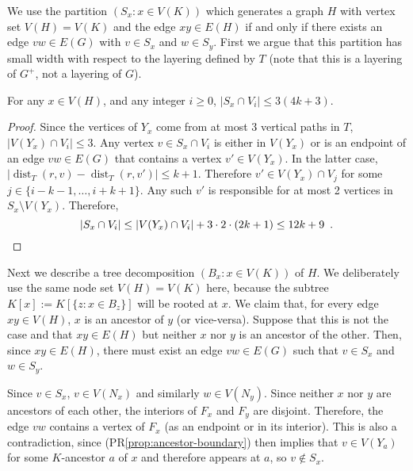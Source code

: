 \documentclass{patmorin}
\DeclareMathOperator{\dist}{dist}
\renewcommand{\propref}[1]{(PR\ref{prop:#1})}
\begin{document}

We use the partition $(S_x: x\in V(K))$ which generates a graph $H$ with vertex set $V(H)=V(K)$ and the edge $xy\in E(H)$ if and only if there exists an edge $vw\in E(G)$ with $v\in S_x$ and $w\in S_y$.  First we argue that this partition has small width with respect to the layering defined by $T$ (note that this is a layering of $G^+$, not a layering of $G$).

\begin{clm}
  For any $x\in V(H)$, and any integer $i\ge 0$, $|S_x\cap V_i|\le 3(4k+3)$.
\end{clm}

\begin{proof}
  Since the vertices of $Y_x$ come from at most 3 vertical paths in $T$, $|V(Y_x)\cap V_i|\le 3$.  Any vertex $v\in S_x\cap V_i$ is either in $V(Y_x)$ or is an endpoint of an edge $vw\in E(G)$ that contains a vertex $v'\in V(Y_x)$.  In the latter case, $|\dist_T(r,v)-\dist_T(r, v')|\le k+1$.  Therefore $v'\in V(Y_x)\cap V_{j}$ for some $j\in\{i-k-1,\ldots,i+k+1\}$.   Any such $v'$ is responsible for at most 2 vertices in $S_x\setminus V(Y_x)$. Therefore,
  \[  |S_x\cap V_i| \le |V(Y_x)\cap V_i| + 3\cdot 2\cdot (2k+1) \le 12k+9 \enspace . \qedhere \]
\end{proof}

Next we describe a tree decomposition $(B_x:x\in V(K))$ of $H$.  We deliberately use the same node set $V(H)=V(K)$ here, because the subtree $K[x]:=K[\{z:x\in B_z\}]$ will be rooted at $x$.  We claim that, for every edge $xy\in V(H)$, $x$ is an ancestor of $y$ (or vice-versa).  Suppose that this is not the case and that $xy\in E(H)$ but neither $x$ nor $y$ is an ancestor of the other.  Then, since $xy\in E(H)$, there must exist an edge $vw\in E(G)$ such that $v\in S_x$ and $w\in S_y$.  

Since $v\in S_x$, $v\in V(N_x)$ and similarly $w\in V(N_y)$.  Since neither $x$ nor $y$ are ancestors of each other, the interiors of $F_x$ and $F_y$ are disjoint.   Therefore, the edge $vw$ contains a vertex of $F_x$ (as an endpoint or in its interior). This is also a contradiction, since \propref{ancestor-boundary} then implies that $v\in V(Y_a)$ for some $K$-ancestor $a$ of $x$ and therefore appears at $a$, so $v\not\in S_x$.
\end{document}
